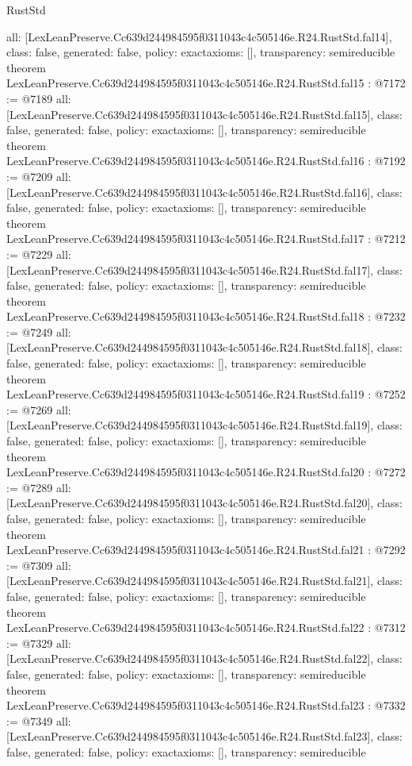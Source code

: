 \begin{lexlean}{RustStd}
\begin{coremodule}
{  all: [LexLeanPreserve.Cc639d244984595f0311043c4c505146e.R24.RustStd.fal14],
  class: false,
  generated: false,
  policy: exact{axioms: []},
  transparency: semireducible
}
theorem LexLeanPreserve.Cc639d244984595f0311043c4c505146e.R24.RustStd.fal15 : @7172 := @7189 {
  all: [LexLeanPreserve.Cc639d244984595f0311043c4c505146e.R24.RustStd.fal15],
  class: false,
  generated: false,
  policy: exact{axioms: []},
  transparency: semireducible
}
theorem LexLeanPreserve.Cc639d244984595f0311043c4c505146e.R24.RustStd.fal16 : @7192 := @7209 {
  all: [LexLeanPreserve.Cc639d244984595f0311043c4c505146e.R24.RustStd.fal16],
  class: false,
  generated: false,
  policy: exact{axioms: []},
  transparency: semireducible
}
theorem LexLeanPreserve.Cc639d244984595f0311043c4c505146e.R24.RustStd.fal17 : @7212 := @7229 {
  all: [LexLeanPreserve.Cc639d244984595f0311043c4c505146e.R24.RustStd.fal17],
  class: false,
  generated: false,
  policy: exact{axioms: []},
  transparency: semireducible
}
theorem LexLeanPreserve.Cc639d244984595f0311043c4c505146e.R24.RustStd.fal18 : @7232 := @7249 {
  all: [LexLeanPreserve.Cc639d244984595f0311043c4c505146e.R24.RustStd.fal18],
  class: false,
  generated: false,
  policy: exact{axioms: []},
  transparency: semireducible
}
theorem LexLeanPreserve.Cc639d244984595f0311043c4c505146e.R24.RustStd.fal19 : @7252 := @7269 {
  all: [LexLeanPreserve.Cc639d244984595f0311043c4c505146e.R24.RustStd.fal19],
  class: false,
  generated: false,
  policy: exact{axioms: []},
  transparency: semireducible
}
theorem LexLeanPreserve.Cc639d244984595f0311043c4c505146e.R24.RustStd.fal20 : @7272 := @7289 {
  all: [LexLeanPreserve.Cc639d244984595f0311043c4c505146e.R24.RustStd.fal20],
  class: false,
  generated: false,
  policy: exact{axioms: []},
  transparency: semireducible
}
theorem LexLeanPreserve.Cc639d244984595f0311043c4c505146e.R24.RustStd.fal21 : @7292 := @7309 {
  all: [LexLeanPreserve.Cc639d244984595f0311043c4c505146e.R24.RustStd.fal21],
  class: false,
  generated: false,
  policy: exact{axioms: []},
  transparency: semireducible
}
theorem LexLeanPreserve.Cc639d244984595f0311043c4c505146e.R24.RustStd.fal22 : @7312 := @7329 {
  all: [LexLeanPreserve.Cc639d244984595f0311043c4c505146e.R24.RustStd.fal22],
  class: false,
  generated: false,
  policy: exact{axioms: []},
  transparency: semireducible
}
theorem LexLeanPreserve.Cc639d244984595f0311043c4c505146e.R24.RustStd.fal23 : @7332 := @7349 {
  all: [LexLeanPreserve.Cc639d244984595f0311043c4c505146e.R24.RustStd.fal23],
  class: false,
  generated: false,
  policy: exact{axioms: []},
  transparency: semireducible
}
\end{coremodule}
\end{lexlean}
